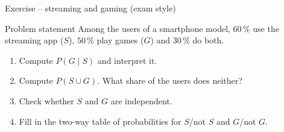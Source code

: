 \documentclass[aspectratio=169,11pt]{beamer}
\begin{document}
\begin{frame}{Exercise -- streaming and gaming (exam style)}
  \begin{block}{Problem statement}
    Among the users of a smartphone model, $60\,\%$ use the streaming app
    ($S$), $50\,\%$ play games ($G$) and $30\,\%$ do both.
    \begin{enumerate}
      \item Compute $P(G\mid S)$ and interpret it.
      \item Compute $P(S\cup G)$. What share of the users does neither?
      \item Check whether $S$ and $G$ are independent.
      \item Fill in the two-way table of probabilities for $S$/not $S$ and
            $G$/not $G$.
    \end{enumerate}
  \end{block}
\end{frame}
\end{document}

